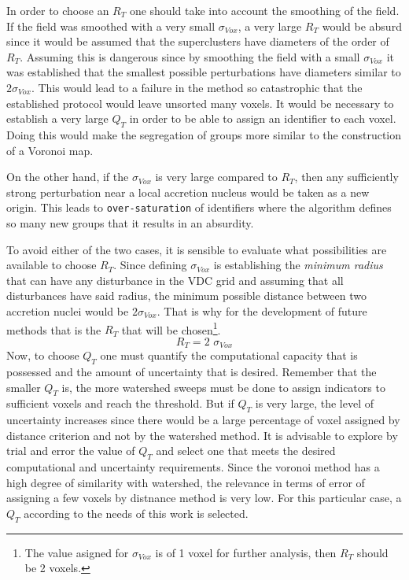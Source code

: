 In order to choose an $R_T$ one should take into account the smoothing of the field. If the field was smoothed with a very small $\sigma_{Vox}$, a very large $R_T$ would be absurd since it would be assumed that the superclusters have diameters of the order of $R_T$. Assuming this is dangerous since by smoothing the field with a small $\sigma_{Vox}$ it was established that the smallest possible perturbations have diameters similar to $2 \sigma_{Vox}$. This would lead to a failure in the method so catastrophic that the established protocol would leave unsorted many voxels. It would be necessary to establish a very large $Q_T$ in order to be able to assign an identifier to each voxel. Doing this would make the segregation of groups more similar to the construction of a Voronoi map.

On the other hand, if the $\sigma_{Vox}$ is very large compared to $R_T$, then any sufficiently strong perturbation near a local accretion nucleus would be taken as a new origin. This leads to \texttt{over-saturation} of identifiers where the algorithm defines so many new groups that it results in an absurdity.

To avoid either of the two cases, it is sensible to evaluate what possibilities are available to choose $R_T$. Since defining $\sigma_{Vox}$  is establishing the \textit{minimum radius} that can have any disturbance in the VDC grid and assuming that all disturbances have said radius, the minimum possible distance between two accretion nuclei would be $2 \sigma_{Vox}$. That is why for the development of future methods that is the $R_T$ that will be chosen\footnote{ The  value asigned for $ \sigma_{Vox}$ is of 1 voxel for further analysis, then $R_T$ should be 2 voxels.}.
\begin{equation}
    R_T = \text{2 } \sigma_{Vox}
\end{equation}
Now, to choose $Q_T$ one must quantify the computational capacity that is possessed and the amount of uncertainty that is desired. Remember that the smaller $Q_T$ is, the more watershed sweeps must be done to assign indicators to sufficient voxels and reach the threshold. But if $Q_T$ is very large, the level of uncertainty increases since there would be a large percentage of voxel assigned by distance criterion and not by the watershed method. It is advisable to explore by trial and error the value of $Q_T$ and select one that meets the desired computational and uncertainty requirements. Since the voronoi method has a high degree of similarity with watershed, the relevance in terms of error of assigning a few voxels by distnance method is very low. For this particular case, a $Q_T$ according to the needs of this work is selected.

